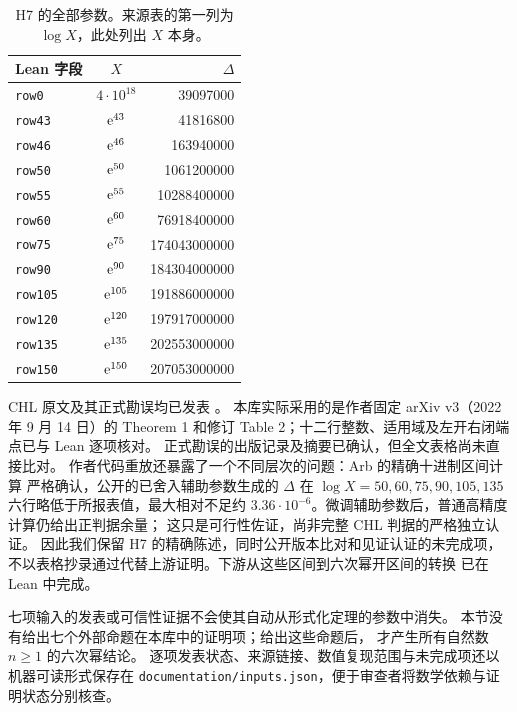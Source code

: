 \begin{table}[htbp]
\centering\small
\caption{H7 的全部参数。来源表的第一列为 $\log X$，此处列出 $X$ 本身。}
\label{tab:chl-input}
\begin{tabular}{lcr}
\toprule
Lean 字段 & $X$ & $\Delta$ \\
\midrule
\texttt{row0} & $4\cdot10^{18}$ & 39097000 \\
\texttt{row43} & $\mathrm e^{43}$ & 41816800 \\
\texttt{row46} & $\mathrm e^{46}$ & 163940000 \\
\texttt{row50} & $\mathrm e^{50}$ & 1061200000 \\
\texttt{row55} & $\mathrm e^{55}$ & 10288400000 \\
\texttt{row60} & $\mathrm e^{60}$ & 76918400000 \\
\texttt{row75} & $\mathrm e^{75}$ & 174043000000 \\
\texttt{row90} & $\mathrm e^{90}$ & 184304000000 \\
\texttt{row105} & $\mathrm e^{105}$ & 191886000000 \\
\texttt{row120} & $\mathrm e^{120}$ & 197917000000 \\
\texttt{row135} & $\mathrm e^{135}$ & 202553000000 \\
\texttt{row150} & $\mathrm e^{150}$ & 207053000000 \\
\bottomrule
\end{tabular}
\end{table}

CHL 原文及其正式勘误均已发表 \cite{CHL,CHLcorr}。
本库实际采用的是作者固定 arXiv v3（2022 年 9 月 14 日）的 Theorem 1
和修订 Table 2；十二行整数、适用域及左开右闭端点已与 Lean 逐项核对。
正式勘误的出版记录及摘要已确认，但全文表格尚未直接比对。
作者代码重放还暴露了一个不同层次的问题：Arb 的精确十进制区间计算
严格确认，公开的已舍入辅助参数生成的 $\Delta$ 在
$\log X=50,60,75,90,105,135$ 六行略低于所报表值，最大相对不足约
$3.36\cdot10^{-6}$。微调辅助参数后，普通高精度计算仍给出正判据余量；
这只是可行性佐证，尚非完整 CHL 判据的严格独立认证。
因此我们保留 H7 的精确陈述，同时公开版本比对和见证认证的未完成项，
不以表格抄录通过代替上游证明。下游从这些区间到六次幂开区间的转换
已在 Lean 中完成。

\begin{remark}[输入与结论的逻辑边界]
七项输入的发表或可信性证据不会使其自动从形式化定理的参数中消失。
本节没有给出七个外部命题在本库中的证明项；给出这些命题后，
才产生所有自然数 $n\ge1$ 的六次幂结论。
逐项发表状态、来源链接、数值复现范围与未完成项还以机器可读形式保存在
\texttt{documentation/inputs.json}，便于审查者将数学依赖与证明状态分别核查。
\end{remark}
